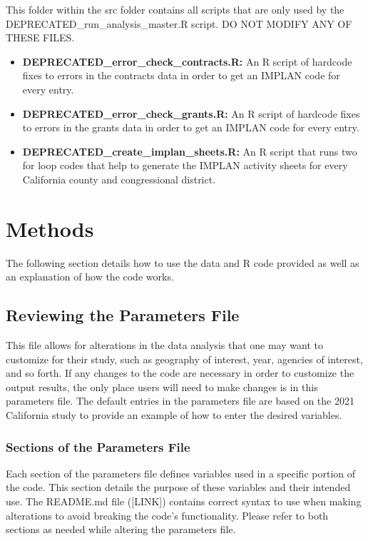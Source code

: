 \documentclass[
]{book}
\providecommand{\tightlist}{%
  \setlength{\itemsep}{0pt}\setlength{\parskip}{0pt}}
\begin{document}
This folder within the src folder contains all scripts that are only used by the DEPRECATED\_run\_analysis\_master.R script. DO NOT MODIFY ANY OF THESE FILES.

\begin{itemize}
\tightlist
\item
  \textbf{DEPRECATED\_error\_check\_contracts.R:} An R script of hardcode fixes to errors in the contracts data in order to get an IMPLAN code for every entry.
\item
  \textbf{DEPRECATED\_error\_check\_grants.R:} An R script of hardcode fixes to errors in the grants data in order to get an IMPLAN code for every entry.\\
\item
  \textbf{DEPRECATED\_create\_implan\_sheets.R:} An R script that runs two for loop codes that help to generate the IMPLAN activity sheets for every California county and congressional district.
\end{itemize}

\hypertarget{methods}{%
\chapter{Methods}\label{methods}}

The following section details how to use the data and R code provided as well as an explanation of how the code works.

\hypertarget{review-p}{%
\section{Reviewing the Parameters File}\label{review-p}}

This file allows for alterations in the data analysis that one may want to customize for their study, such as geography of interest, year, agencies of interest, and so forth. If any changes to the code are necessary in order to customize the output results, the only place users will need to make changes is in this parameters file. The default entries in the parameters file are based on the 2021 California study to provide an example of how to enter the desired variables.

\hypertarget{sections-p}{%
\subsection{Sections of the Parameters File}\label{sections-p}}

Each section of the parameters file defines variables used in a specific portion of the code. This section details the purpose of these variables and their intended use. The README.md file ({[}LINK{]}) contains correct syntax to use when making alterations to avoid breaking the code's functionality. Please refer to both sections as needed while altering the parameters file.
\end{document}
